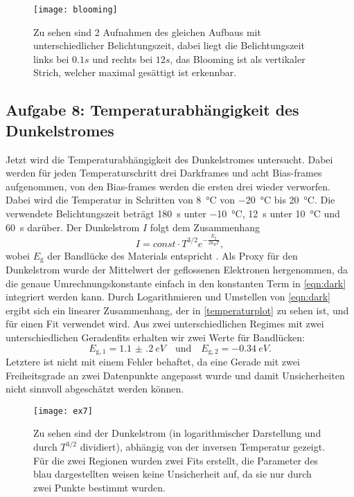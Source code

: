 \begin{figure}[H]
	\centering
	\texttt{[image: blooming]}
	\caption{Zu sehen sind 2 Aufnahmen des gleichen Aufbaus mit unterschiedlicher Belichtungszeit, dabei liegt die Belichtungszeit links bei $0.1 \unit{s}$ und rechts bei $12 \unit{s}$, das Blooming ist als vertikaler Strich, welcher maximal gesättigt ist erkennbar.}
	\label{bloomingbild}
\end{figure}


\subsection{Aufgabe 8: Temperaturabhängigkeit des Dunkelstromes}
\label{Aufgabe8}
Jetzt wird die Temperaturabhängigkeit des Dunkelstromes untersucht. Dabei werden für jeden Temperaturschritt drei Darkframes und acht Bias-frames aufgenommen, von den Bias-frames werden die ersten drei wieder verworfen. Dabei wird die Temperatur in Schritten von \SI{8}{\degreeCelsius} von \SI{-20}{\degreeCelsius} bis \SI{20}{\degreeCelsius}. Die verwendete Belichtungszeit beträgt \SI{180}{s} unter \SI{-10}{\degreeCelsius}, \SI{12}{s} unter \SI{10}{\degreeCelsius} und \SI{60}{s} darüber.   
Der Dunkelstrom $I$ folgt dem Zusammenhang
\begin{equation}\label{eqn:dark}
	I= const\cdot T^{3/2}e^{-\frac{E_\mathrm{g}}{2k_\mathrm{B}T}},
\end{equation}
wobei $E_\mathrm{g}$ der Bandlücke des Materials entspricht \cite{ccd}. Als Proxy für den Dunkelstrom wurde der Mittelwert der geflossenen Elektronen hergenommen, da die genaue Umrechnungskonstante einfach in den konstanten Term in \autoref{eqn:dark} integriert werden kann. Durch Logarithmieren und Umstellen von \autoref{eqn:dark} ergibt sich ein linearer Zusammenhang, der in \autoref{temperaturplot} zu sehen ist, und für einen Fit verwendet wird. Aus zwei unterschiedlichen Regimes mit zwei unterschiedlichen Geradenfits erhalten wir zwei Werte für Bandlücken:
$$E_\mathrm{g,1}=\SI{1.1(2)}{eV} \quad\mathrm{und}\quad E_\mathrm{g,2}=\SI{-0.34}{eV}. $$ Letztere ist nicht mit einem Fehler behaftet, da eine Gerade mit zwei Freiheitsgrade an zwei Datenpunkte angepasst wurde und damit Unsicherheiten nicht sinnvoll abgeschätzt werden können.


\begin{figure}[H]
	\centering
	\texttt{[image: ex7]}
	\caption{Zu sehen sind der Dunkelstrom (in logarithmischer Darstellung und durch $T^{3/2}$ dividiert), abhängig von der inversen Temperatur gezeigt. Für die zwei Regionen wurden zwei Fits erstellt, die Parameter des blau dargestellten weisen keine Unsicherheit auf, da sie nur durch zwei Punkte bestimmt wurden. }
	\label{temperaturplot}
\end{figure}